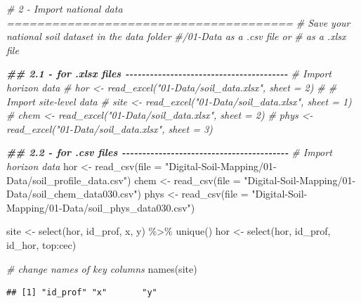 \documentclass[
  10pt,
  b5paper,
  oneside]{book}
\newenvironment{Shaded}{\begin{snugshade}}{\end{snugshade}}
\newcommand{\AttributeTok}[1]{\textcolor[rgb]{0.77,0.63,0.00}{#1}}
\newcommand{\CommentTok}[1]{\textcolor[rgb]{0.56,0.35,0.01}{\textit{#1}}}
\newcommand{\DocumentationTok}[1]{\textcolor[rgb]{0.56,0.35,0.01}{\textbf{\textit{#1}}}}
\newcommand{\FunctionTok}[1]{\textcolor[rgb]{0.00,0.00,0.00}{#1}}
\newcommand{\NormalTok}[1]{#1}
\newcommand{\OtherTok}[1]{\textcolor[rgb]{0.56,0.35,0.01}{#1}}
\newcommand{\SpecialCharTok}[1]{\textcolor[rgb]{0.00,0.00,0.00}{#1}}
\newcommand{\StringTok}[1]{\textcolor[rgb]{0.31,0.60,0.02}{#1}}
\begin{document}
\begin{Shaded}
\begin{Highlighting}[]
\CommentTok{\# 2 {-} Import national data ======================================}
\CommentTok{\# Save your national soil dataset in the data folder }
\CommentTok{\#/01{-}Data as a .csv file or }
\CommentTok{\# as a .xlsx file}

\DocumentationTok{\#\# 2.1 {-} for .xlsx files {-}{-}{-}{-}{-}{-}{-}{-}{-}{-}{-}{-}{-}{-}{-}{-}{-}{-}{-}{-}{-}{-}{-}{-}{-}{-}{-}{-}{-}{-}{-}{-}{-}{-}{-}{-}{-}{-}{-}{-}}
\CommentTok{\# Import horizon data }
\CommentTok{\# hor \textless{}{-} read\_excel("01{-}Data/soil\_data.xlsx", sheet = 2)}
\CommentTok{\# \# Import site{-}level data}
\CommentTok{\# site \textless{}{-} read\_excel("01{-}Data/soil\_data.xlsx", sheet = 1)}
\CommentTok{\# chem \textless{}{-} read\_excel("01{-}Data/soil\_data.xlsx", sheet = 2)}
\CommentTok{\# phys \textless{}{-} read\_excel("01{-}Data/soil\_data.xlsx", sheet = 3)}


\DocumentationTok{\#\# 2.2 {-} for .csv files {-}{-}{-}{-}{-}{-}{-}{-}{-}{-}{-}{-}{-}{-}{-}{-}{-}{-}{-}{-}{-}{-}{-}{-}{-}{-}{-}{-}{-}{-}{-}{-}{-}{-}{-}{-}{-}{-}{-}{-}{-}}
\CommentTok{\# Import horizon data }
\NormalTok{hor }\OtherTok{\textless{}{-}} 
  \FunctionTok{read\_csv}\NormalTok{(}\AttributeTok{file =} 
            \StringTok{"Digital{-}Soil{-}Mapping/01{-}Data/soil\_profile\_data.csv"}\NormalTok{)}
\NormalTok{chem }\OtherTok{\textless{}{-}} \FunctionTok{read\_csv}\NormalTok{(}\AttributeTok{file =} 
            \StringTok{"Digital{-}Soil{-}Mapping/01{-}Data/soil\_chem\_data030.csv"}\NormalTok{)}
\NormalTok{phys }\OtherTok{\textless{}{-}} \FunctionTok{read\_csv}\NormalTok{(}\AttributeTok{file =}
            \StringTok{"Digital{-}Soil{-}Mapping/01{-}Data/soil\_phys\_data030.csv"}\NormalTok{)}

\NormalTok{site }\OtherTok{\textless{}{-}} \FunctionTok{select}\NormalTok{(hor, id\_prof, x, y) }\SpecialCharTok{\%\textgreater{}\%} \FunctionTok{unique}\NormalTok{()}
\NormalTok{hor }\OtherTok{\textless{}{-}} \FunctionTok{select}\NormalTok{(hor, id\_prof, id\_hor, top}\SpecialCharTok{:}\NormalTok{cec)}

\CommentTok{\# change names of key columns}
\FunctionTok{names}\NormalTok{(site)}
\end{Highlighting}
\end{Shaded}

\begin{verbatim}
## [1] "id_prof" "x"       "y"
\end{verbatim}
\end{document}
